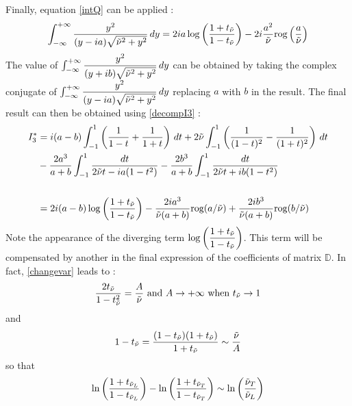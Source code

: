Finally, equation \eqref{intQ} can be applied :
\begin{equation}
\int_{-\infty}^{+\infty} \frac{y^2}{(y-ia)\sqrt{\tilde{\nu}^2+y^2}} \, dy =2ia\log\left(\frac{1+t_{\tilde{\nu}}}{1-t_{\tilde{\nu}}}\right)-2i\frac{a^2}{\tilde{\nu}}\mbox{rog}\left(\frac{a}{\tilde{\nu}}\right)
\label{y2_D}
\end{equation}
The value of $\int_{-\infty}^{+\infty} \dfrac{y^2}{(y+ib)\sqrt{\tilde{\nu}^2+y^2}} \, dy $ can be obtained by taking the complex conjugate of  $\int_{-\infty}^{+\infty} \dfrac{y^2}{(y-ia)\sqrt{\tilde{\nu}^2+y^2}} \, dy $ replacing $a$ with $b$ in the result. The final result can then be obtained using \eqref{decompI3} :
\begin{equation}
\begin{split}
I_3^*&=i(a-b)\int_{-1}^1 \left( \frac{1}{1-t}+\frac{1}{1+t} \right) \, dt+ 2\tilde{\nu} \int_{-1}^1 \left( \frac{1}{(1-t)^2}-\frac{1}{(1+t)^2} \right) \, dt \\
 &-\frac{2a^3}{a+b}\int_{-1}^1\frac{dt}{2\tilde{\nu} t-ia(1-t^2)}-\frac{2b^3}{a+b}\int_{-1}^1\frac{dt}{2\tilde{\nu} t+ib(1-t^2)}\\
 ~\\
 &=2i(a-b)\log\left(\frac{1+t_{\tilde{\nu}}}{1-t_{\tilde{\nu}}}\right)-\frac{2ia^3}{\tilde{\nu}(a+b)}\mbox{rog}(a/\tilde{\nu})+\frac{2ib^3}{\tilde{\nu}(a+b)}\mbox{rog}(b/\tilde{\nu}) 
\end{split}
\label{valI3}
\end{equation}
Note the appearance of the diverging term $\log\left(\dfrac{1+t_{\tilde{\nu}}}{1-t_{\tilde{\nu}}}\right)$. This term will be compensated by another in the final expression of the coefficients of matrix $\mathbb{D}$. In fact, \eqref{changevar} leads to :
\begin{equation}
\frac{2t_{\tilde{\nu}}}{1-t_{\tilde{\nu}}^2}=\frac{A}{\tilde{\nu}} \mbox{ and } A\rightarrow + \infty \mbox{ when } t_{\tilde{\nu}} \rightarrow 1
\end{equation}
and
\begin{equation}
1-t_{\tilde{\nu}} =\frac{(1-t_{\tilde{\nu}})(1+t_{\tilde{\nu}})}{1+t_{\tilde{\nu}}} \sim \frac{\tilde{\nu}}{A}
\end{equation}
so that
\begin{equation}
\ln\left(\frac{1+t_{\tilde{\nu}_L}}{1-t_{\tilde{\nu}_L}}\right)- \ln\left(\frac{1+t_{\tilde{\nu}_T}}{1-t_{\tilde{\nu}_T}}\right)\sim \ln\left(\frac{\tilde{\nu}_T}{\tilde{\nu}_L}\right) 
\label{compensation}
\end{equation}

